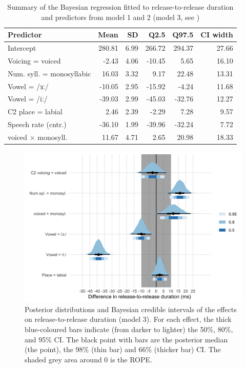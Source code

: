 \documentclass[12pt,a4paper,]{article}
\begin{document}
\begin{table}

\caption{\label{tab:rr-3-table}Summary of the Bayesian regression fitted to release-to-release duration and predictors from model 1 and 2 (model 3, see )}
\centering
\fontsize{8}{10}\selectfont
\begin{tabular}[t]{lrrrrr}
\toprule
Predictor & Mean & SD & Q2.5 & Q97.5 & CI width\\
\midrule
Intercept & 280.81 & 6.99 & 266.72 & 294.37 & 27.66\\
Voicing = voiced & -2.43 & 4.06 & -10.45 & 5.65 & 16.10\\
Num. syll. = monosyllabic & 16.03 & 3.32 & 9.17 & 22.48 & 13.31\\
Vowel = /ɜː/ & -10.05 & 2.95 & -15.92 & -4.24 & 11.68\\
Vowel = /iː/ & -39.03 & 2.99 & -45.03 & -32.76 & 12.27\\
C2 place = labial & 2.46 & 2.39 & -2.29 & 7.28 & 9.57\\
Speech rate (cntr.) & -36.10 & 1.99 & -39.96 & -32.24 & 7.72\\
voiced × monosyll. & 11.67 & 4.71 & 2.65 & 20.98 & 18.33\\
\bottomrule
\end{tabular}
\end{table}

\begin{figure}
\includegraphics[width=\linewidth]{2019-english-rr_files/figure-latex/Figure1-1} \caption{Posterior distributions and Bayesian credible intervals of the effects on release-to-release duration (model 3). For each effect, the thick blue-coloured bars indicate (from darker to lighter) the 50\%, 80\%, and 95\% CI. The black point with bars are the posterior median (the point), the 98\% (thin bar) and 66\% (thicker bar) CI. The shaded grey area around 0 is the ROPE.}\label{f:Figure1}
\end{figure}
\end{document}

